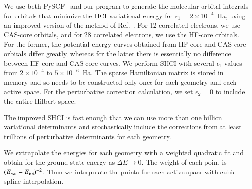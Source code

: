 We use both PySCF~\cite{SunCha_etal_PySCF-ComMolSci-18} and our program to generate the molecular orbital integrals for orbitals that minimize the HCI variational
energy for $\epsilon_1=2\times 10^{-4}$~Ha, using an improved version of the method of Ref.~\cite{SmiMusHolSha-JCTC-17}.
For 12 correlated electrons, we use CAS-core orbitals, and for 28 correlated electrons, we use the HF-core orbitals.
For the former, the potential energy curves obtained from HF-core and CAS-core orbitals differ greatly,
whereas for the latter there is essentially no difference between HF-core and CAS-core curves.
We perform SHCI with several $\epsilon_1$ values from $2\times10^{-4}$ to $5\times10^{-6}$~Ha.
The sparse Hamiltonian matrix is stored in memory and so needs to be constructed only once for each geometry and each active space.
For the perturbative correction calculation, we set $\epsilon_2 = 0$  to include the entire Hilbert space.

The improved SHCI is fast enough that we can use more than one billion variational determinants and stochastically include the corrections from at least trillions of perturbative determinants for each geometry.

We extrapolate the energies for each geometry with a weighted quadratic fit
and obtain for the ground state energy as $\Delta E\to0$.
The weight of each point is $(E_{\rm var} - E_{\rm tot})^{-2}$.
Then we interpolate the points for each active space with cubic spline interpolation.

